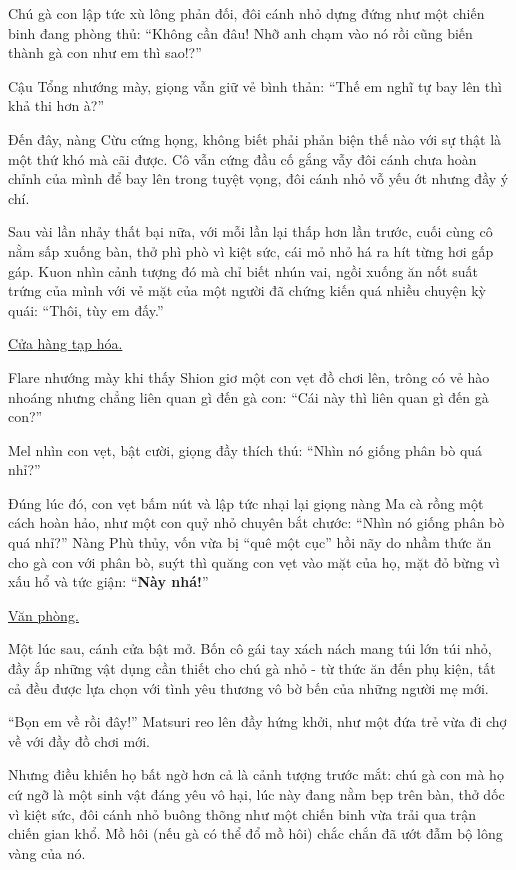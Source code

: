 \documentclass[../main.tex]{subfiles}
\begin{document}
Chú gà con lập tức xù lông phản đối, đôi cánh nhỏ dựng đứng như một chiến binh đang phòng thủ: ``Không cần đâu! Nhỡ anh chạm vào nó rồi cũng biến thành gà con như em thì sao!?''

Cậu Tổng nhướng mày, giọng vẫn giữ vẻ bình thản: ``Thế em nghĩ tự bay lên thì khả thi hơn à?''

Đến đây, nàng Cừu cứng họng, không biết phải phản biện thế nào với sự thật là một thứ khó mà cãi được. Cô vẫn cứng đầu cố gắng vẫy đôi cánh chưa hoàn chỉnh của mình để bay lên trong tuyệt vọng, đôi cánh nhỏ vỗ yếu ớt nhưng đầy ý chí.

Sau vài lần nhảy thất bại nữa, với mỗi lần lại thấp hơn lần trước, cuối cùng cô nằm sấp xuống bàn, thở phì phò vì kiệt sức, cái mỏ nhỏ há ra hít từng hơi gấp gáp. Kuon nhìn cảnh tượng đó mà chỉ biết nhún vai, ngồi xuống ăn nốt suất trứng của mình với vẻ mặt của một người đã chứng kiến quá nhiều chuyện kỳ quái: ``Thôi, tùy em đấy.''

\begin{center}
  \uline{Cửa hàng tạp hóa.}
\end{center}

Flare nhướng mày khi thấy Shion giơ một con vẹt đồ chơi lên, trông có vẻ hào nhoáng nhưng chẳng liên quan gì đến gà con: ``Cái này thì liên quan gì đến gà con?''


Mel nhìn con vẹt, bật cười, giọng đầy thích thú: ``Nhìn nó giống phân bò quá nhỉ?''

Đúng lúc đó, con vẹt bấm nút và lập tức nhại lại giọng nàng Ma cà rồng một cách hoàn hảo, như một con quỷ nhỏ chuyên bắt chước: ``Nhìn nó giống phân bò quá nhỉ?'' Nàng Phù thủy, vốn vừa bị ``quê một cục'' hồi nãy do nhầm thức ăn cho gà con với phân bò, suýt thì quăng con vẹt vào mặt của họ, mặt đỏ bừng vì xấu hổ và tức giận: ``\textbf{Này nhá!}''

\begin{center}
  \uline{Văn phòng.}
\end{center}

Một lúc sau, cánh cửa bật mở. Bốn cô gái tay xách nách mang túi lớn túi nhỏ, đầy ắp những vật dụng cần thiết cho chú gà nhỏ - từ thức ăn đến phụ kiện, tất cả đều được lựa chọn với tình yêu thương vô bờ bến của những người mẹ mới.

``Bọn em về rồi đây!'' Matsuri reo lên đầy hứng khởi, như một đứa trẻ vừa đi chợ về với đầy đồ chơi mới.


Nhưng điều khiến họ bất ngờ hơn cả là cảnh tượng trước mắt: chú gà con mà họ cứ ngỡ là một sinh vật đáng yêu vô hại, lúc này đang nằm bẹp trên bàn, thở dốc vì kiệt sức, đôi cánh nhỏ buông thõng như một chiến binh vừa trải qua trận chiến gian khổ. Mồ hôi (nếu gà có thể đổ mồ hôi) chắc chắn đã ướt đẫm bộ lông vàng của nó.
\end{document}
